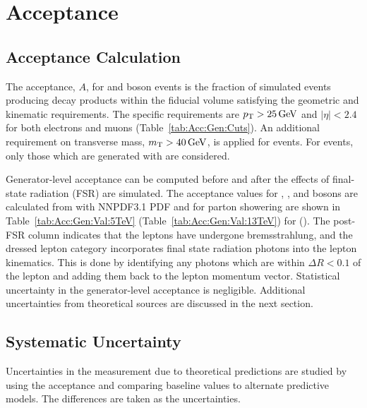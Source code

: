\chapter{Acceptance}\label{ch:acceptance}

\section{Acceptance Calculation}
The acceptance, $A$, for \Wpm and \Z boson events is the fraction of simulated events producing decay products within the fiducial volume satisfying the geometric and kinematic requirements. The specific requirements are $p_{\mathrm{T}}>25\,\text{Ge\hspace{-.08em}V}$ and $|\eta| < 2.4$ for both electrons and muons (Table~\ref{tab:Acc:Gen:Cuts}). An additional requirement on transverse mass, $m_{\mathrm{T}} > 40 \,\text{Ge\hspace{-.08em}V}$, is
applied for \Wpm events. For \Z events, only those which are generated with \masswindow are considered.

Generator-level acceptance can be computed before and after the effects of final-state radiation (FSR) are simulated. The acceptance values for \Wp, \Wm, and \Z bosons are calculated from \aMCATNLO with NNPDF3.1 PDF and  for parton showering are shown in Table~\ref{tab:Acc:Gen:Val:5TeV} (Table~\ref{tab:Acc:Gen:Val:13TeV}) for \sg (\sh). The post-FSR column indicates that the leptons have undergone bremsstrahlung, and the dressed lepton category incorporates final state radiation photons into the lepton kinematics. This is done by identifying any photons which are within $\Delta R < 0.1$ of the lepton and adding them back to the lepton momentum vector. Statistical uncertainty in the generator-level acceptance is negligible. Additional uncertainties from theoretical sources are discussed in the next section.



% 
% 

\section{Systematic Uncertainty}\label{ch:acc:unc}
Uncertainties in the measurement due to theoretical predictions are studied by using the acceptance and comparing baseline values to alternate predictive models. The differences are taken as the uncertainties.

